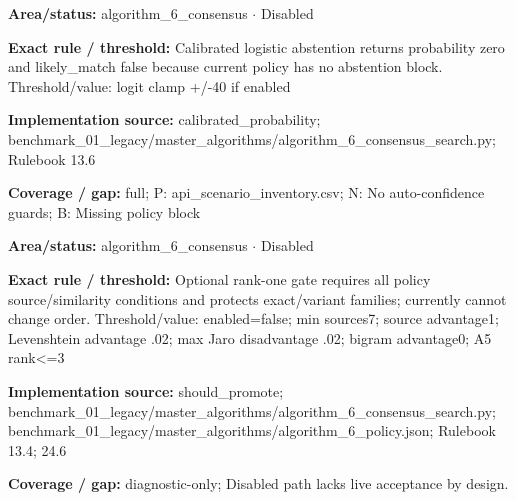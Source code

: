 \begin{tcolorbox}[enhanced,breakable,colback=white,colframe=Muted!45,boxrule=0.45pt,arc=1.5pt,left=6pt,right=6pt,top=5pt,bottom=5pt,title={\texttt{A6-PROBABILITY-07}},title after break={\texttt{A6-PROBABILITY-07}\ (continued)},fonttitle=\headingfont\bfseries\color{Navy},coltitle=Navy]
\textbf{Area/status:} algorithm\_\allowbreak{}6\_\allowbreak{}consensus $\boldsymbol{\cdot}$ Disabled\par
\smallskip
\textbf{Exact rule / threshold:} Calibrated logistic abstention returns probability zero and likely\_\allowbreak{}match false because current policy has no abstention block. Threshold/\allowbreak{}value: logit clamp +/\allowbreak{}-40 if enabled\par
\smallskip
\textbf{Implementation source:} calibrated\_\allowbreak{}probability; benchmark\_\allowbreak{}01\_\allowbreak{}legacy/\allowbreak{}master\_\allowbreak{}algorithms/\allowbreak{}algorithm\_\allowbreak{}6\_\allowbreak{}consensus\_\allowbreak{}search.py; Rulebook 13.6\par
\smallskip
\textbf{Coverage / gap:} full; P: api\_\allowbreak{}scenario\_\allowbreak{}inventory.csv; N: No auto-confidence guards; B: Missing policy block
\end{tcolorbox}
\begin{tcolorbox}[enhanced,breakable,colback=white,colframe=Muted!45,boxrule=0.45pt,arc=1.5pt,left=6pt,right=6pt,top=5pt,bottom=5pt,title={\texttt{A6-RANK1-GATE-05}},title after break={\texttt{A6-RANK1-GATE-05}\ (continued)},fonttitle=\headingfont\bfseries\color{Navy},coltitle=Navy]
\textbf{Area/status:} algorithm\_\allowbreak{}6\_\allowbreak{}consensus $\boldsymbol{\cdot}$ Disabled\par
\smallskip
\textbf{Exact rule / threshold:} Optional rank-one gate requires all policy source/\allowbreak{}similarity conditions and protects exact/\allowbreak{}variant families; currently cannot change order. Threshold/\allowbreak{}value: enabled=false; min sources7; source advantage1; Levenshtein advantage .02; max Jaro disadvantage .02; bigram advantage0; A5 rank<=3\par
\smallskip
\textbf{Implementation source:} should\_\allowbreak{}promote; benchmark\_\allowbreak{}01\_\allowbreak{}legacy/\allowbreak{}master\_\allowbreak{}algorithms/\allowbreak{}algorithm\_\allowbreak{}6\_\allowbreak{}consensus\_\allowbreak{}search.py; benchmark\_\allowbreak{}01\_\allowbreak{}legacy/\allowbreak{}master\_\allowbreak{}algorithms/\allowbreak{}algorithm\_\allowbreak{}6\_\allowbreak{}policy.json; Rulebook 13.4; 24.6\par
\smallskip
\textbf{Coverage / gap:} diagnostic-only; Disabled path lacks live acceptance by design.
\end{tcolorbox}
